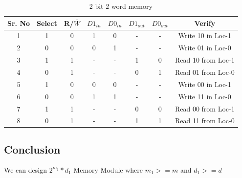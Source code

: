 \documentclass[a4paper]{article}
\begin{document}
\begin{table}[h!]
    \begin{center}
        \begin{tabular}{|c|c|c|c|c|c|c|c|}
            \hline
            \textbf{Sr. No} & \textbf{Select} & \textbf{R/$\overline{W}$} & \textbf{$D1_{in}$} & \textbf{$D0_{in}$} & \textbf{$D1_{out}$} & \textbf{$D0_{out}$} & \textbf{Verify}    \\
            \hline
            1               & 1               & 0                         & 1                  & 0                  & -                   & -                   & Write 10 in Loc-1  \\
            2               & 0               & 0                         & 0                  & 1                  & -                   & -                   & Write 01 in Loc-0  \\
            3               & 1               & 1                         & -                  & -                  & 1                   & 0                   & Read 10 from Loc-1 \\
            4               & 0               & 1                         & -                  & -                  & 0                   & 1                   & Read 01 from Loc-0 \\
            5               & 1               & 0                         & 0                  & 0                  & -                   & -                   & Write 00 in Loc-1  \\
            6               & 0               & 0                         & 1                  & 1                  & -                   & -                   & Write 11 in Loc-0  \\
            7               & 1               & 1                         & -                  & -                  & 0                   & 0                   & Read 00 from Loc-1 \\
            8               & 0               & 1                         & -                  & -                  & 1                   & 1                   & Read 11 from Loc-0 \\
            \hline
        \end{tabular}
        \label{tab:2b2w}
        \caption{2 bit 2 word memory}
    \end{center}
\end{table}

\subsection{Conclusion}
We can design $2^{m_1} \ast d_1$ Memory Module where $m_1 >= m$ and $d_1 >= d$
\pagebreak
\end{document}
